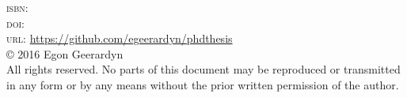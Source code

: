\thispagestyle{empty}
\begin{bottompar}

\textsc{isbn:} \\
\textsc{doi:} \\
\textsc{url:} \url{https://github.com/egeerardyn/phdthesis}\\

\copyright{} 2016 Egon Geerardyn\\

All rights reserved. No parts of this document may be reproduced or transmitted in any form or by any means without the prior written permission of the author.


\end{bottompar}
